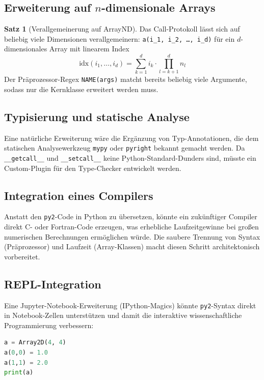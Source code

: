 \documentclass[a4paper,12pt]{article}
\theoremstyle{definition}
\newtheorem{satz}{Satz}
\begin{document}
\subsection{Erweiterung auf $n$-dimensionale Arrays}

\begin{satz}[Verallgemeinerung auf ArrayND]
	Das Call-Protokoll l\"asst sich auf beliebig viele Dimensionen verallgemeinern:
	\texttt{a(i\_1, i\_2, \ldots, i\_d)} f\"ur ein $d$-dimensionales Array mit
	linearem Index
	\[
		\text{idx}(i_1, \ldots, i_d) = \sum_{k=1}^{d} i_k \cdot \prod_{l=k+1}^{d} n_l
	\]
	Der Pr\"aprozessor-Regex \texttt{NAME(args)} matcht bereits beliebig viele
	Argumente, sodass nur die Kernklasse erweitert werden muss.
\end{satz}

\subsection{Typisierung und statische Analyse}

Eine nat\"urliche Erweiterung w\"are die Erg\"anzung von Typ-Annotationen, die dem
statischen Analysewerkzeug \texttt{mypy} oder \texttt{pyright} bekannt gemacht werden.
Da \texttt{\_\_getcall\_\_} und \texttt{\_\_setcall\_\_} keine Python-Standard-Dunders
sind, m\"usste ein Custom-Plugin f\"ur den Type-Checker entwickelt werden.

\subsection{Integration eines Compilers}

Anstatt den \texttt{py2}-Code in Python zu \"ubersetzen, k\"onnte ein zuk\"unftiger
Compiler direkt C- oder Fortran-Code erzeugen, was erhebliche Laufzeitgewinne
bei gro\ss{}en numerischen Berechnungen erm\"oglichen w\"urde. Die saubere Trennung
von Syntax (Pr\"aprozessor) und Laufzeit (Array-Klassen) macht diesen Schritt
architektonisch vorbereitet.

\subsection{REPL-Integration}

Eine Jupyter-Notebook-Erweiterung (IPython-Magics) k\"onnte \texttt{py2}-Syntax
direkt in Note\-book-Zellen unterst\"utzen und damit die interaktive wissenschaftliche
Programmierung verbessern:

\begin{lstlisting}[language=Python, caption={Hypothetische Jupyter-Integration}]
%%py2
a = Array2D(4, 4)
a(0,0) = 1.0
a(1,1) = 2.0
print(a)
\end{lstlisting}
\end{document}

